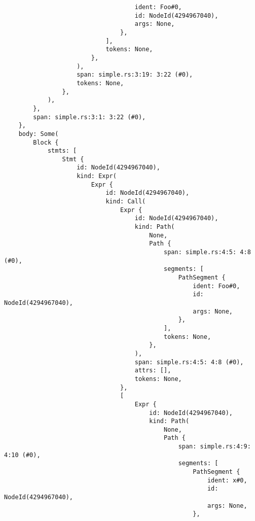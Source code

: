 \documentclass[
  11pt,
  twoside,symmetric]{report}
\begin{document}
\begin{verbatim}
                                    ident: Foo#0,
                                    id: NodeId(4294967040),
                                    args: None,
                                },
                            ],
                            tokens: None,
                        },
                    ),
                    span: simple.rs:3:19: 3:22 (#0),
                    tokens: None,
                },
            ),
        },
        span: simple.rs:3:1: 3:22 (#0),
    },
    body: Some(
        Block {
            stmts: [
                Stmt {
                    id: NodeId(4294967040),
                    kind: Expr(
                        Expr {
                            id: NodeId(4294967040),
                            kind: Call(
                                Expr {
                                    id: NodeId(4294967040),
                                    kind: Path(
                                        None,
                                        Path {
                                            span: simple.rs:4:5: 4:8 (#0),
                                            segments: [
                                                PathSegment {
                                                    ident: Foo#0,
                                                    id: NodeId(4294967040),
                                                    args: None,
                                                },
                                            ],
                                            tokens: None,
                                        },
                                    ),
                                    span: simple.rs:4:5: 4:8 (#0),
                                    attrs: [],
                                    tokens: None,
                                },
                                [
                                    Expr {
                                        id: NodeId(4294967040),
                                        kind: Path(
                                            None,
                                            Path {
                                                span: simple.rs:4:9: 4:10 (#0),
                                                segments: [
                                                    PathSegment {
                                                        ident: x#0,
                                                        id: NodeId(4294967040),
                                                        args: None,
                                                    },

\end{verbatim}
\end{document}

